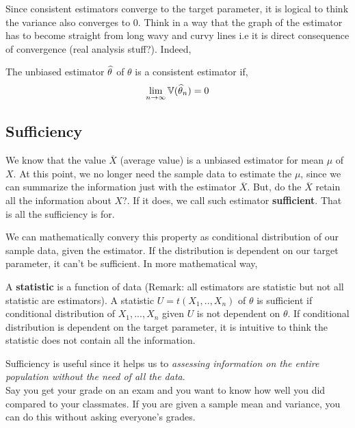 Since consistent estimators converge to the target parameter, it is logical to think the variance also converges to $0$. Think in a way that the graph of the estimator has to become straight from long wavy and curvy lines i.e it is direct consequence of convergence (real analysis stuff?). Indeed,
\begin{theorem}
    The unbiased estimator ${\widehat{\theta}}$ of $\theta$ is a consistent estimator if, 
    \[ \lim_{n \rightarrow \infty} {\mathbb{V}}({\widehat{\theta}}_{n}) = 0 \]
\end{theorem}




\subsection*{Sufficiency}
We know that the value $\overline{X}$ (average value) is a unbiased estimator for mean $\mu$ of $X$. At this point, we no longer need the sample data to estimate the $\mu$, since we can summarize the information just with the estimator $\overline{X}$.
But, do the $\overline{X}$ retain all the information about $X$?. If it does, we call such estimator \textbf{sufficient}. That is all the sufficiency is for.

We can mathematically convery this property as conditional distribution of our sample data, given the estimator. If the distribution is dependent on our target parameter, it can't be sufficient. In more mathematical way,
\begin{definition}
    A \textbf{statistic} is a function of data (Remark: all estimators are statistic but not all statistic are estimators). A statistic $U = t(X_1,..,X_n)$ of $\theta$ is sufficient if conditional distribution of $X_1,...,X_n$ given $U$ is not dependent on $\theta$.
    \newline
    \newline
    If conditional distribution is dependent on the target parameter, it is intuitive to think the statistic does not contain all the information.
\end{definition}
Sufficiency is useful since it helps us to \textit{assessing information on the  entire population without the need of all the data}.\\
Say you get your grade on an exam and you want to know how well you did compared to your classmates. If you are given a sample mean and variance, you can do this without asking everyone's grades.


